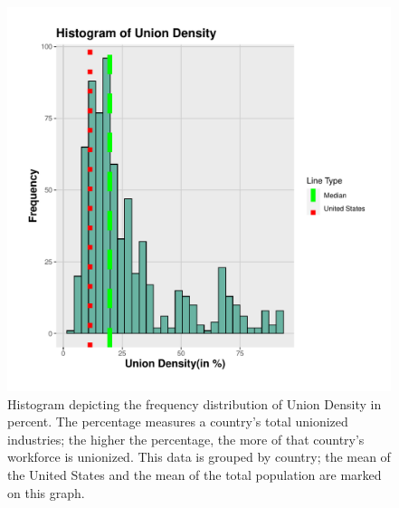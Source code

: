 \documentclass[11pt]{article}\usepackage[]{graphicx}\usepackage[]{xcolor}
\newenvironment{knitrout}{}{} %
\begin{document}
\begin{figure}[h]
\centering
  \begin{minipage}{0.7\linewidth}
\begin{knitrout}
\color{fgcolor}

{\centering \includegraphics[width=0.7\linewidth]{figure/UnionDensity-1} 

}


\end{knitrout}
  \caption{Histogram depicting the frequency distribution of Union Density in percent. The percentage measures a country's total unionized industries; the higher the percentage, the more of that country's workforce is unionized. This data is grouped by country; the mean of the United States and the mean of the total population are marked on this graph.} 
  \label{fig:2.2}
  \end{minipage}
\end{figure}
\end{document}
